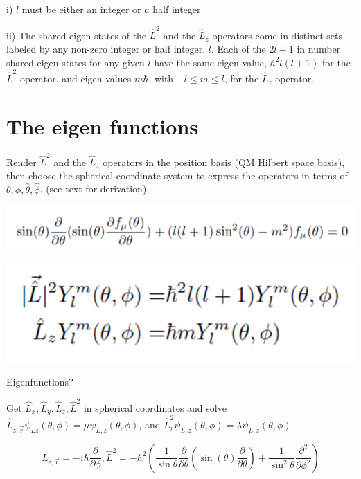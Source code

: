 \documentclass{article}
\begin{document}
i) $l$ must be either an integer or $a$ half integer

ii) The shared eigen states of the $\widehat{L}^{2}$ and the $\widehat{L}_{z}$ operators come in distinct sets labeled by any non-zero integer or half integer, $l$. Each of the $2 l+1$ in number shared eigen states for any given $l$ have the same eigen value, $\hbar^{2} l(l+1)$ for the $\widehat{L}^{2}$ operator, and eigen values $m \hbar$, with $-l \leq m \leq l$, for the $\widehat{L}_{z}$ operator.

\section{The eigen functions}

Render  $\hat{L}^2$ and the $\hat{L}_z$ operators in the position basis (QM Hilbert space basis), then choose the spherical coordinate system to express the operators in terms of  $\theta, \phi, \hat{\theta}, \hat{\phi}$. (see text for derivation)   

\includegraphics[width = 0.45 \textwidth]{Lecture22/4.png}


\includegraphics[width = 0.3 \textwidth]{Lecture22/5.png}

Eigenfunctions?

Get $\hat{L}_x, \hat{L}_y, \hat{L}_z, \hat{L}^2$ in spherical coordinates and solve $\hat{L}_{z, \vec r} \psi_{Lz}(\theta,\phi) = \mu \psi_{L,z} (\theta, \phi)$, and  $\hat{L}_r^2 \psi_{L,z} (\theta,\phi) = \lambda \psi_{L,z} (\theta, \phi)$

$$L_{z,\vec{r}} = - i \hbar \frac{\partial}{\partial \phi}, \hat{L}^2 = - \hbar^2 \left( \frac{1}{\sin{\theta}} \frac{\partial}{\partial \theta} \left( \sin(\theta) \frac{\partial}{\partial \theta} \right) + \frac{1}{\sin^2 \theta} \frac{\partial^2}{\partial \phi^2} \right)$$

\end{document}
